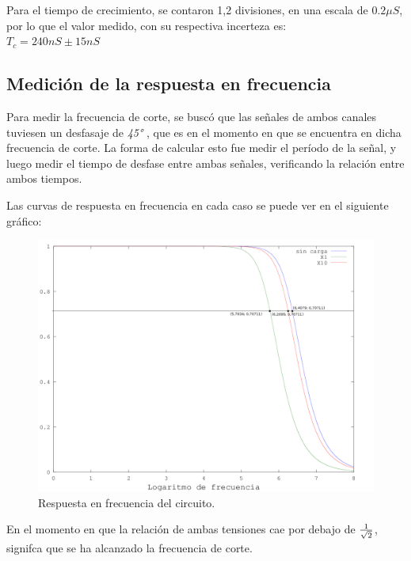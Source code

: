 \documentclass{article}
\begin{document}
	Para el tiempo de crecimiento, se contaron 1,2 divisiones, en una escala de $0.2 \mu S$, por lo que el valor medido, con su respectiva incerteza es: \\

$T_c = 240 nS \pm 15 nS$\\



\subsection{Medición de la respuesta en frecuencia}
	
	Para medir la frecuencia de corte, se buscó que las señales de ambos canales tuviesen un desfasaje de \textit{45°} , que es en el momento en que se encuentra en dicha frecuencia de corte.
La forma de calcular esto fue medir el período de la señal, y luego medir el tiempo de desfase entre ambas señales, verificando la relación entre ambos tiempos.
\bigskip\medskip

Las curvas de respuesta en frecuencia en cada caso se puede ver en el siguiente gráfico:\\

\begin{figure}[h]
	\centering
	\includegraphics[width=1\textwidth]{images/2-respuesta-en-frecuencia.png}
	\medskip
	\caption{Respuesta en frecuencia del circuito.}
\end{figure}
\bigskip\bigskip
\bigskip

En el momento en que la relación de ambas tensiones cae por debajo de ${1 \over \sqrt{2}}$, signifca que se ha alcanzado la frecuencia de corte.
\end{document}
